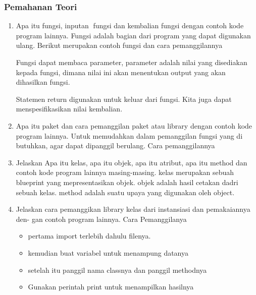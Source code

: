 \subsubsection{Pemahanan Teori}
\begin{enumerate}
    \item Apa itu fungsi, inputan fungsi dan kembalian fungsi dengan contoh kode program
    lainnya.
    Fungsi adalah bagian dari program yang dapat digunakan ulang.
    Berikut merupakan contoh fungsi dan cara pemanggilannya
    

    Fungsi dapat membaca parameter, parameter adalah nilai yang disediakan kepada fungsi, dimana nilai ini akan menentukan output yang akan dihasilkan fungsi.
    

    Statemen return digunakan untuk keluar dari fungsi. Kita juga dapat menspesifikasikan nilai kembalian.
    

    \item Apa itu paket dan cara pemanggilan paket atau library dengan contoh kode
    program lainnya.
    Untuk memudahkan dalam pemanggilan fungsi yang di butuhkan, agar dapat dipanggil berulang.
    Cara pemanggilannya
    

    \item Jelaskan Apa itu kelas, apa itu objek, apa itu atribut, apa itu method dan
    contoh kode program lainnya masing-masing.
    kelas merupakan sebuah blueprint yang mepresentasikan objek.
    objek adalah hasil cetakan dadri sebuah kelas.
    method adalah suatu upaya yang digunakan oleh object.
    

    \item Jelaskan cara pemanggikan library kelas dari instansiasi dan pemakaiannya den-
    gan contoh program lainnya.
    Cara Pemanggilanya
    \begin{itemize}
        \item pertama import terlebih dahulu filenya.
        \item kemudian buat variabel untuk menampung datanya
        \item setelah itu panggil nama classnya dan panggil methodnya
        \item Gunakan perintah print untuk menampilkan hasilnya


\end{itemize}
\end{enumerate}
